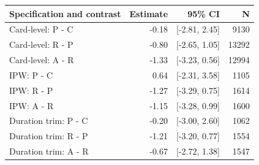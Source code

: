 \begin{tabular}{@{}p{5.8cm}rrr@{}}
\toprule
Specification and contrast & Estimate & 95\% CI & N \\
\midrule
Card-level: P - C & -0.18 & [-2.81, 2.45] & 9130 \\
Card-level: R - P & -0.80 & [-2.65, 1.05] & 13292 \\
Card-level: A - R & -1.33 & [-3.23, 0.56] & 12994 \\
IPW: P - C & 0.64 & [-2.31, 3.58] & 1105 \\
IPW: R - P & -1.27 & [-3.29, 0.75] & 1614 \\
IPW: A - R & -1.15 & [-3.28, 0.99] & 1600 \\
Duration trim: P - C & -0.20 & [-3.00, 2.60] & 1062 \\
Duration trim: R - P & -1.21 & [-3.20, 0.77] & 1554 \\
Duration trim: A - R & -0.67 & [-2.72, 1.38] & 1547 \\
\bottomrule
\end{tabular}
